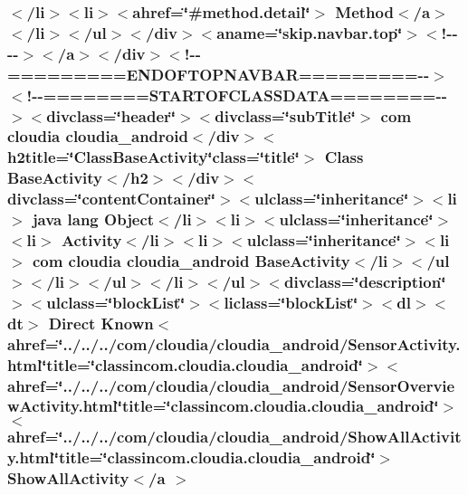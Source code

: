 \hypertarget{_base_activity_8html_ac60c75b5acba2007167647a1d60f82d8}{
\subsubsection[{Show\-All\-Activity$<$/a $>$}]{\setlength{\rightskip}{0pt plus 5cm}$<$/li$>$$<$li$>$$<$ahref=\char`\"{}\#method.\-detail\char`\"{}$>$ Method$<$/{\bf a}$>$$<$/li$>$$<$/ul$>$$<$/div$>$$<$aname=\char`\"{}skip.\-navbar.\-top\char`\"{}$>$$<$!-\/-\/-\/-\/$>$$<$/a$>$$<$/div$>$$<$!-\/-\/=========E\-N\-D\-O\-F\-T\-O\-P\-N\-A\-V\-B\-A\-R=========-\/-\/$>$$<$!-\/-\/========S\-T\-A\-R\-T\-O\-F\-C\-L\-A\-S\-S\-D\-A\-T\-A========-\/-\/$>$$<$divclass=\char`\"{}header\char`\"{}$>$$<$divclass=\char`\"{}sub\-Title\char`\"{}$>$ com cloudia cloudia\-\_\-android$<$/div$>$$<$h2title=\char`\"{}Class\-Base\-Activity\char`\"{}class=\char`\"{}title\char`\"{}$>$ Class {\bf Base\-Activity}$<$/h2$>$$<$/div$>$$<$divclass=\char`\"{}content\-Container\char`\"{}$>$$<$ulclass=\char`\"{}inheritance\char`\"{}$>$$<$li$>$ java lang Object$<$/li$>$$<$li$>$$<$ulclass=\char`\"{}inheritance\char`\"{}$>$$<$li$>$ Activity$<$/li$>$$<$li$>$$<$ulclass=\char`\"{}inheritance\char`\"{}$>$$<$li$>$ com cloudia cloudia\-\_\-android {\bf Base\-Activity}$<$/li$>$$<$/ul$>$$<$/li$>$$<$/ul$>$$<$/li$>$$<$/ul$>$$<$divclass=\char`\"{}description\char`\"{}$>$$<$ulclass=\char`\"{}block\-List\char`\"{}$>$$<$liclass=\char`\"{}block\-List\char`\"{}$>$$<$dl$>$$<${\bf dt}$>$ Direct Known$<$ahref=\char`\"{}../../../com/cloudia/cloudia\-\_\-android/Sensor\-Activity.\-html\char`\"{}title=\char`\"{}classincom.\-cloudia.\-cloudia\-\_\-android\char`\"{}$>$$<$ahref=\char`\"{}../../../com/cloudia/cloudia\-\_\-android/Sensor\-Overview\-Activity.\-html\char`\"{}title=\char`\"{}classincom.\-cloudia.\-cloudia\-\_\-android\char`\"{}$>$$<$ahref=\char`\"{}../../../com/cloudia/cloudia\-\_\-android/Show\-All\-Activity.\-html\char`\"{}title=\char`\"{}classincom.\-cloudia.\-cloudia\-\_\-android\char`\"{}$>$ Show\-All\-Activity$<$/{\bf a} $>$}}\label{_base_activity_8html_ac60c75b5acba2007167647a1d60f82d8}
